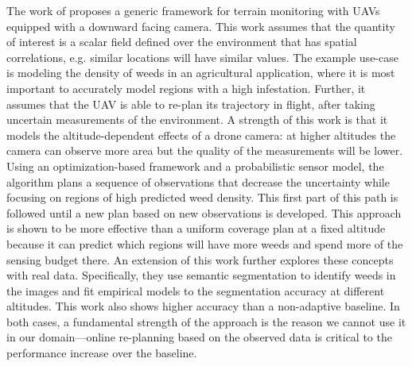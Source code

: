 The work of \cite{Popovic2020} proposes a generic framework for terrain monitoring with UAVs equipped with a downward facing camera. This work assumes that the quantity of interest is a scalar field defined over the environment that has spatial correlations, e.g. similar locations will have similar values. The example use-case is modeling the density of weeds in an agricultural application, where it is most important to accurately model regions with a high infestation. Further, it assumes that the UAV is able to re-plan its trajectory in flight, after taking uncertain measurements of the environment. A strength of this work is that it models the altitude-dependent effects of a drone camera: at higher altitudes the camera can observe more area but the quality of the measurements will be lower. Using an optimization-based framework and a probabilistic sensor model, the algorithm plans a sequence of observations that decrease the uncertainty while focusing on regions of high predicted weed density. This first part of this path is followed until a new plan based on new observations is developed. This approach is shown to be more effective than a uniform coverage plan at a fixed altitude because it can predict which regions will have more weeds and spend more of the sensing budget there. An extension of this work \cite{Stache2021AdaptiveSegmentation} further explores these concepts with real data. Specifically, they use semantic segmentation to identify weeds in the images and fit empirical models to the segmentation accuracy at different altitudes. This work also shows higher accuracy than a non-adaptive baseline. In both cases, a fundamental strength of the approach is the reason we cannot use it in our domain---online re-planning based on the observed data is critical to the performance increase over the baseline.

